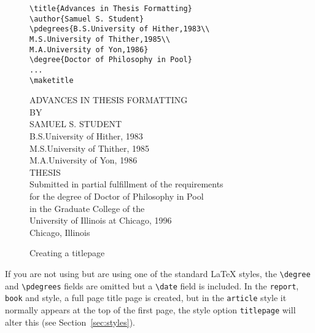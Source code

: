 \begin{figure}
\footnotesize
\begin{minipage}[t]{0.48\textwidth}
\begin{verbatim}
\title{Advances in Thesis Formatting}
\author{Samuel S. Student}
\pdegrees{B.S.University of Hither,1983\\
M.S.University of Thither,1985\\
M.A.University of Yon,1986}
\degree{Doctor of Philosophy in Pool}
...
\maketitle
\end{verbatim}
\end{minipage}\hfill
\begin{minipage}[t]{0.48\textwidth}
\begin{center}
\begin{singlespace}
{\normalsize ADVANCES IN THESIS FORMATTING}\\[12ex]
BY\\[1ex]
SAMUEL S. STUDENT\\B.S.University of Hither, 1983\\
M.S.University of Thither, 1985\\M.A.University of Yon, 1986\\[6ex]
THESIS\\[2ex]
Submitted in partial fulfillment of the requirements\\
for the degree of Doctor of Philosophy in Pool\\
in the Graduate College of the\\
University of Illinois at Chicago, 1996\\[4ex]
Chicago, Illinois
\end{singlespace}
\end{center}
\end{minipage}
\vspace{1em}
\caption{Creating a titlepage}\label{fig:titlepage}
\end{figure}
 
If you are not using \uicthesi{} but are using one of the standard \LaTeX{}
styles, the \verb+\degree+ and \verb+\pdegrees+ fields are omitted
but a \verb+\date+ field is included.
In the \verb+report+, \verb+book+ and \uicthesi{} style,
a full page title page is created, but
in the {\tt article} style it normally appears at the top
of the first page, the style option {\tt titlepage} will alter this (see
Section~\ref{sec:styles}).
 
